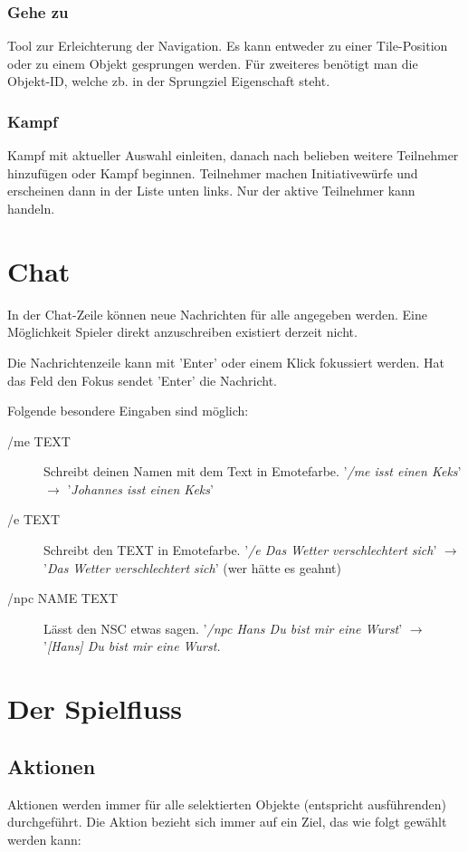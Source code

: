 \documentclass[german,10pt,a4paper,twocolumn,colorscheme=darkblue]{orarticle}
\begin{document}
		\subsubsection*{Gehe zu}
			Tool zur Erleichterung der Navigation. Es kann entweder zu einer Tile-Position oder zu einem Objekt gesprungen werden. Für zweiteres benötigt man die Objekt-ID, welche zb. in der Sprungziel Eigenschaft steht.
		\subsubsection*{Kampf}
			Kampf mit aktueller Auswahl einleiten, danach nach belieben weitere Teilnehmer hinzufügen oder Kampf beginnen. Teilnehmer machen Initiativewürfe und erscheinen dann in der Liste unten links. Nur der aktive Teilnehmer kann handeln.
		
	\section{Chat}
		In der Chat-Zeile können neue Nachrichten für alle angegeben werden. Eine Möglichkeit Spieler direkt anzuschreiben existiert derzeit nicht.
		
		Die Nachrichtenzeile kann mit 'Enter' oder einem Klick fokussiert werden. Hat das Feld den Fokus sendet 'Enter' die Nachricht.
		
		Folgende besondere Eingaben sind möglich:
		\begin{description}
		\item[/me TEXT] Schreibt deinen Namen mit dem Text in Emotefarbe. '\textit{/me isst einen Keks}' $\rightarrow$ '\textit{Johannes isst einen Keks}'
		\item[/e TEXT] Schreibt den TEXT in Emotefarbe. '\textit{/e Das Wetter verschlechtert sich}' $\rightarrow$ '\textit{Das Wetter verschlechtert sich}' (wer hätte es geahnt)
		 \item[/npc NAME TEXT] Lässt den NSC etwas sagen. '\textit{/npc Hans Du bist mir eine Wurst}' $\rightarrow$ '\textit{[Hans] Du bist mir eine Wurst.}
		\end{description}
	
	\section{Der Spielfluss}
		\subsection{Aktionen}
			\label{Aktionen}
			Aktionen werden immer für alle selektierten Objekte (entspricht ausführenden) durchgeführt. Die Aktion bezieht sich immer auf ein Ziel, das wie folgt gewählt werden kann:
			
\end{document}
